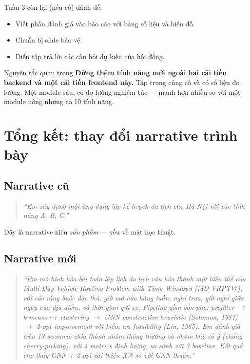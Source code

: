 \documentclass[12pt,a4paper]{report}
\begin{document}
Tuần 3 còn lại (nếu có) dành để:
\begin{itemize}[leftmargin=*]
    \item Viết phần đánh giá vào báo cáo với bảng số liệu và biểu đồ.
    \item Chuẩn bị slide bảo vệ.
    \item Diễn tập trả lời các câu hỏi dự kiến của hội đồng.
\end{itemize}

\begin{warningbox}{Nguyên tắc quan trọng}
\textbf{Đừng thêm tính năng mới ngoài hai cải tiến backend và một cải tiến frontend này.} Tập trung củng cố và có số liệu đo lường. Một module sâu, có đo lường nghiêm túc --- mạnh hơn nhiều so với một module nông nhưng có 10 tính năng.
\end{warningbox}

\chapter{Tổng kết: thay đổi narrative trình bày}

\section{Narrative cũ}
\begin{quote}
\textit{``Em xây dựng một ứng dụng lập kế hoạch du lịch cho Hà Nội với các tính năng A, B, C.''}
\end{quote}

Đây là narrative kiểu \textit{sản phẩm} --- yếu về mặt học thuật.

\section{Narrative mới}
\begin{quote}
\textit{``Em mô hình hóa bài toán lập lịch du lịch văn hóa thành một biến thể của Multi-Day Vehicle Routing Problem with Time Windows (MD-VRPTW), với các ràng buộc đặc thù: giờ mở cửa hàng tuần, nghỉ trưa, giờ nghỉ giữa ngày của địa điểm, và thời gian gửi xe. Pipeline gồm bốn pha: prefilter $\rightarrow$ k-means++ clustering $\rightarrow$ GNN constructive heuristic (Solomon, 1987) $\rightarrow$ 2-opt improvement với kiểm tra feasibility (Lin, 1965). Em đánh giá trên 13 scenario chia thành nhóm thông thường và nhóm khó cố ý (chống cherry-picking), với 4 metrics định lượng, so sánh với 3 baseline. Kết quả cho thấy GNN + 2-opt cải thiện X\% so với GNN thuần.''}
\end{quote}
\end{document}
